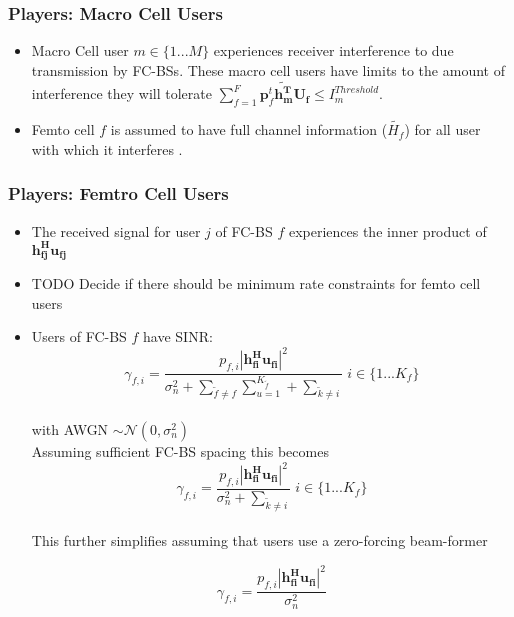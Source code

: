 \documentclass[12pt]{article}
\begin{document}
\subsubsection{Players: Macro Cell Users}

\begin{itemize}
\item 
Macro Cell user $m \in \{1 ... M\}$ experiences receiver interference to due transmission by FC-BSs. These macro cell users have limits to the amount of interference they will tolerate 
$\sum^F_{f=1} \mathbf{p}_f^t \mathbf{\tilde{h_m^T}}  \mathbf{U_f}  \leq I^{Threshold}_{m} $.
\\
\item Femto cell $f$ is assumed to have full channel information ($\tilde{H_f}$) for all user with which it interferes .
\\
\end{itemize}


\subsubsection{Players: Femtro Cell Users}
\begin{itemize}


\item The received signal for user $j$ of FC-BS $f$ experiences the inner product of $\mathbf{h^H_{fj}u_{fj}}$

\item TODO Decide if there should be minimum rate constraints for femto cell users
\\

\item Users of FC-BS $f$ have SINR:
\begin{equation}
\gamma_{f,i} = \frac{p_{f,i}|\mathbf{h^H_{fi}u_{fi}}|^2}
{\sigma^2_{n}  + \sum_{\tilde{f}\neq f} \sum_{u=1}^{K_{\tilde{f}}} + \sum_{\tilde{k}\neq i}} \; i \in \{1 ... K_f\}
\end{equation}
\\
with AWGN $\sim \mathcal{N}(0,\sigma^2_n)$
\\

Assuming sufficient FC-BS spacing this becomes 
\begin{equation}
\gamma_{f,i} = \frac{p_{f,i}|\mathbf{h^H_{fi}u_{fi}}|^2}{\sigma^2_{n}  +  \sum_{\tilde{k}\neq i}} \; i \in \{1 ... K_f\}
\end{equation}
\\

This further simplifies assuming that users use a zero-forcing beam-former

\begin{equation}
\gamma_{f,i} = \frac{p_{f,i}|\mathbf{h^H_{fi}u_{fi}}|^2}{\sigma^2_{n} }
\end{equation}
\\

\end{itemize}
\end{document}
